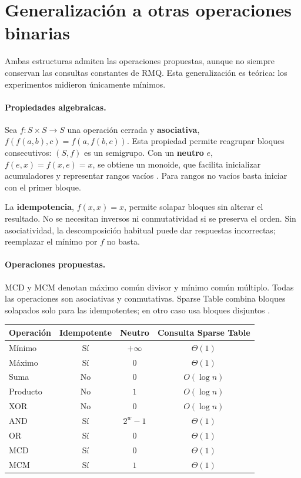 \section{Generalización a otras operaciones binarias}

Ambas estructuras admiten las operaciones propuestas, aunque no siempre
conservan las consultas constantes de RMQ. Esta generalización es teórica:
los experimentos midieron únicamente mínimos.

\paragraph{Propiedades algebraicas.}
Sea \(f:S\times S\to S\) una operación cerrada y
\textbf{asociativa}, \(f(f(a,b),c)=f(a,f(b,c))\). Esta propiedad permite
reagrupar bloques consecutivos: \((S,f)\) es un semigrupo.
Con un \textbf{neutro} \(e\), \(f(e,x)=f(x,e)=x\), se obtiene un
monoide, que facilita inicializar acumuladores y representar rangos vacíos
\cite{atcoder-segtree}. Para rangos no vacíos basta iniciar con el primer bloque.

La \textbf{idempotencia}, \(f(x,x)=x\), permite solapar bloques sin
alterar el resultado. No se necesitan inversos ni conmutatividad si se
preserva el orden. Sin asociatividad, la descomposición habitual puede dar
respuestas incorrectas; reemplazar el mínimo por \(f\) no basta.

\paragraph{Operaciones propuestas.}
MCD y MCM denotan máximo común divisor y mínimo común múltiplo.
Todas las operaciones son asociativas y conmutativas. Sparse Table combina bloques
solapados solo para las idempotentes; en otro caso usa bloques disjuntos
\cite{cp-sparse-table}.

\begin{center}
\begingroup
\small
\setlength{\tabcolsep}{7pt}
\renewcommand{\arraystretch}{1.12}
\begin{tabular}{@{}lccc@{}}
    \toprule
    Operación & Idempotente & Neutro & Consulta Sparse Table \\
    \midrule
    Mínimo & Sí & \(+\infty\) & \(\Theta(1)\) \\
    Máximo & Sí & \(0\) & \(\Theta(1)\) \\
    Suma & No & \(0\) & \(O(\log n)\) \\
    Producto & No & \(1\) & \(O(\log n)\) \\
    XOR & No & \(0\) & \(O(\log n)\) \\
    AND & Sí & \(2^w-1\) & \(\Theta(1)\) \\
    OR & Sí & \(0\) & \(\Theta(1)\) \\
    MCD & Sí & \(0\) & \(\Theta(1)\) \\
    MCM & Sí & \(1\) & \(\Theta(1)\) \\
    \bottomrule
\end{tabular}
\endgroup
\end{center}

